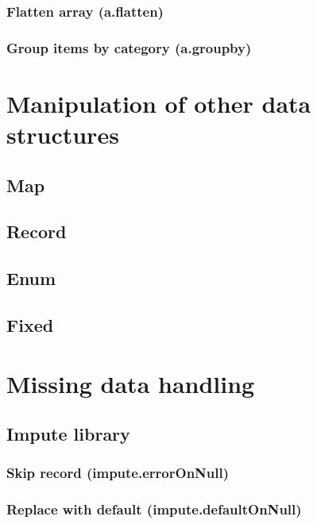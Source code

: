 \documentclass{article}
\theoremstyle{definition}
\begin{document}
\subsubsection{Flatten array (a.flatten)}

\subsubsection{Group items by category (a.groupby)}

\pagebreak

\section{Manipulation of other data structures}

\subsection{Map}

\subsection{Record}

\subsection{Enum}

\subsection{Fixed}

\pagebreak

\section{Missing data handling}

\subsection{Impute library}

\subsubsection{Skip record (impute.errorOnNull)}

\subsubsection{Replace with default (impute.defaultOnNull)}
\end{document}
